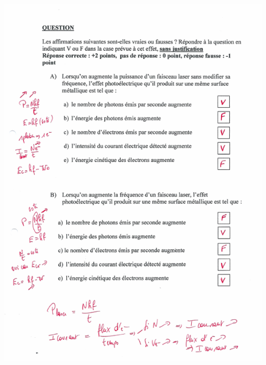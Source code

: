 {{{\includegraphics[width=17.498cm,height=24.13cm]{Pictures/10000001000002570000033B70807DBABEAE0DEC.png}

}}}
